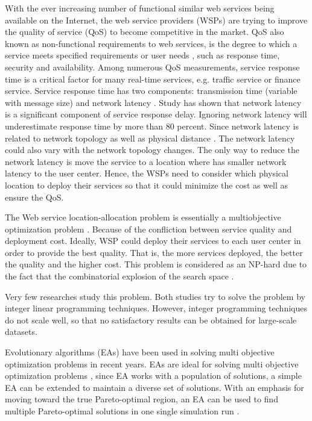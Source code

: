 \documentclass[twoside]{article}
\begin{document}
With the ever increasing number of functional similar web services being available on the Internet, the web service providers (WSPs) are trying to improve the quality of service (QoS) to become competitive in the market.  
QoS also known as non-functional requirements to  web services, is the degree to which a service meets specified requirements or user needs \cite{4061431}, such as response time, security and availability. 
Among numerous QoS measurements, service response time is a critical factor for many real-time services, e.g. traffic service or finance service. 
Service response time has two components: transmission time (variable with message size) and network latency \cite{Johansson:2000:INL:595252.595281}. 
Study \cite{Johansson:2000:INL:595252.595281, 916684} has shown that network latency is a significant component of service response delay.
Ignoring network latency will underestimate response time by more than 80 percent. Since network latency is related to network topology as well as physical distance \cite{distanceMetrics}. 
The network latency could also vary with the network topology changes.
The only way to reduce the network latency is move the service to a location where has smaller network latency to the user center. 
Hence, the WSPs need to consider which physical location to deploy their services so that it could minimize the cost as well as ensure the QoS.

The Web service location-allocation problem is essentially a multiobjective optimization problem \cite{Multiobjective}.
Because of the confliction between service quality and deployment cost. 
Ideally, WSP could deploy their services to each user center in order to provide the best quality.
That is, the more services deployed, the better the quality and the higher cost. 
This problem is considered as an NP-hard due to the fact that the combinatorial explosion of the search space \cite{Vanrompay:2008:GAO:1387309.1387313}. 


Very few researches \cite{Aboolian200964, Sun:2006:LMW:1217741.1217754} study this problem.
Both studies try to solve the problem by integer linear programming techniques.
However, integer programming techniques do not scale well, so that no satisfactory results can be obtained for large-scale datasets. 

Evolutionary algorithms (EAs) have been used in solving multi objective optimization problems in recent years. 
EAs are ideal for solving multi objective optimization problems \cite{key:article}, since EA works with a population of solutions, a simple EA can be extended to maintain a diverse set of solutions.
With an emphasis for moving toward the true Pareto-optimal region, an EA can be used to find multiple Pareto-optimal solutions in one single simulation run \cite{OptimizationElectrical}.
\end{document}

